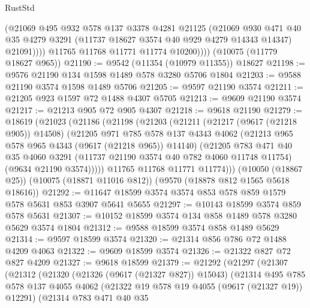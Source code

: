 \begin{lexlean}{RustStd}
\begin{coremodule}
{\begin{coremodule}
{{{{{{{{{{{{{{{{{{{{{{{{{{{{{{{{{                (@21069
                  @495
                  @932
                  @578
                  @137
                  @3378
                  @4281
                  @21125
                  (@21069
                    @930
                    @471
                    @40
                    @35
                    @4279
                    @3291
                    (@11737 @18627 @3574 @40 @929 @4279 @14343 @14347)
                    @21091))))
            @11765
            @11768
            @11771
            @11774
            @10200))))
    (@10075 (@11779 @18627 @965))
@21190 := @9542 (@11354 (@10979 @11355)) @18627
@21198 := @9576 @21190 @134 @1598 @1489 @578 @3280 @5706 @1804
@21203 := @9588 @21190 @3574 @1598 @1489 @5706
@21205 := @9597 @21190 @3574
@21211 := @21205 @923 @1597 @72 @1488 @4307 @5705
@21213 := @9609 @21190 @3574
@21217 := @21213 @905 @72 @905 @4307
@21218 := @9618 @21190
@21279 := @18619
    (@21023
      (@21186
        (@21198
          (@21203
            (@21211
              (@21217 (@9617 (@21218 @905)) @14508)
              (@21205
                @971
                @785
                @578
                @137
                @4343
                @4062
                (@21213 @965 @578 @965 @4343 (@9617 (@21218 @965)) @14140)
                (@21205
                  @783
                  @471
                  @40
                  @35
                  @4060
                  @3291
                  (@11737 @21190 @3574 @40 @782 @4060 @11748 @11754)
                  (@9634 @21190 @3574)))))
          @11765
          @11768
          @11771
          @11774)))
    (@10050 (@18867 @25))
    (@10075 (@18871 @11016 @812))
    (@9570 (@18878 @812 @1565 @5618 @18616))
@21292 := @11647 @18599 @3574 @3574 @853 @578 @859 @1579 @578 @5631 @853 @3907 @5641 @5655
@21297 := @10143 @18599 @3574 @859 @578 @5631
@21307 := @10152 @18599 @3574 @134 @858 @1489 @578 @3280 @5629 @3574 @1804
@21312 := @9588 @18599 @3574 @858 @1489 @5629
@21314 := @9597 @18599 @3574
@21320 := @21314 @856 @786 @72 @1488 @4209 @4063
@21322 := @9609 @18599 @3574
@21326 := @21322 @827 @72 @827 @4209
@21327 := @9618 @18599
@21379 := @21292
    (@21297
      (@21307
        (@21312
          (@21320
            (@21326 (@9617 (@21327 @827)) @15043)
            (@21314
              @495
              @785
              @578
              @137
              @4055
              @4062
              (@21322 @19 @578 @19 @4055 (@9617 (@21327 @19)) @12291)
              (@21314
                @783
                @471
                @40
                @35
}}}}}}}}}}}}}}}}}}}}}}}}}}}}}}}}}
\end{coremodule}}
\end{coremodule}
\end{lexlean}
